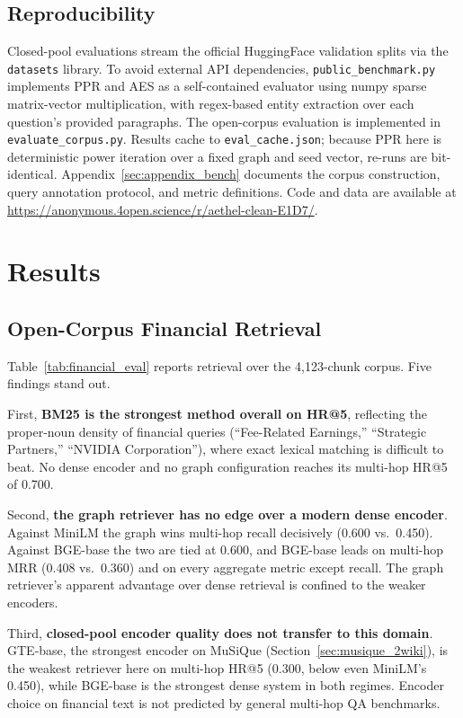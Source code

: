 \documentclass[runningheads]{llncs}
\begin{document}
\subsection{Reproducibility}

Closed-pool evaluations stream the official HuggingFace validation splits via the \texttt{datasets} library. To avoid external API dependencies, \texttt{public\_benchmark.py} implements PPR and AES as a self-contained evaluator using numpy sparse matrix-vector multiplication, with regex-based entity extraction over each question's provided paragraphs. The open-corpus evaluation is implemented in \texttt{evaluate\_corpus.py}. Results cache to \texttt{eval\_cache.json}; because PPR here is deterministic power iteration over a fixed graph and seed vector, re-runs are bit-identical. Appendix~\ref{sec:appendix_bench} documents the corpus construction, query annotation protocol, and metric definitions. Code and data are available at \url{https://anonymous.4open.science/r/aethel-clean-E1D7/}.

\section{Results}

\subsection{Open-Corpus Financial Retrieval}
\label{sec:open_corpus}

Table~\ref{tab:financial_eval} reports retrieval over the 4{,}123-chunk corpus. Five findings stand out.

First, \textbf{BM25 is the strongest method overall on HR@5}, reflecting the proper-noun density of financial queries (``Fee-Related Earnings,'' ``Strategic Partners,'' ``NVIDIA Corporation''), where exact lexical matching is difficult to beat. No dense encoder and no graph configuration reaches its multi-hop HR@5 of 0.700.

Second, \textbf{the graph retriever has no edge over a modern dense encoder}. Against MiniLM the graph wins multi-hop recall decisively (0.600 vs.\ 0.450). Against BGE-base the two are tied at 0.600, and BGE-base leads on multi-hop MRR (0.408 vs.\ 0.360) and on every aggregate metric except recall. The graph retriever's apparent advantage over dense retrieval is confined to the weaker encoders.

Third, \textbf{closed-pool encoder quality does not transfer to this domain}. GTE-base, the strongest encoder on MuSiQue (Section~\ref{sec:musique_2wiki}), is the weakest retriever here on multi-hop HR@5 (0.300, below even MiniLM's 0.450), while BGE-base is the strongest dense system in both regimes. Encoder choice on financial text is not predicted by general multi-hop QA benchmarks.
\end{document}

